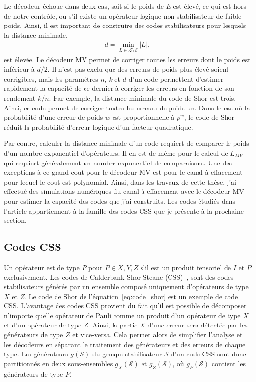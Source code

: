 Le décodeur échoue dans deux cas,
soit si le poids de $E$ est élevé, ce qui est hors de notre contrôle,
ou s'il existe un opérateur logique non stabilisateur de faible poids.
Ainsi,
il est important de construire des codes stabilisateurs pour lesquels la distance minimale,
\begin{align}
  d = \min_{L \in \mathcal L \setminus \mathcal S} |L|,
\end{align}
est élevée.
Le décodeur MV permet de corriger toutes les erreurs dont le poids est inférieur à $d / 2$.
Il n'est pas exclu que des erreurs de poids plus élevé soient corrigibles, 
mais les paramètres $n$, $k$ et $d$ d'un code permettent d'estimer rapidement la capacité
de ce dernier à corriger les erreurs en fonction de son rendement $k/n$.
Par exemple,
la distance minimale du code de Shor est trois.
Ainsi, ce code permet de corriger toutes les erreurs de poids un.
Dans le cas où la probabilité d'une erreur de poids $w$ est proportionnelle à $p^w$,
le code de Shor réduit la probabilité d'erreur logique d'un facteur quadratique.

Par contre,
calculer la distance minimale d'un code requiert de comparer le poids d'un nombre exponentiel d'opérateurs.
Il en est de même pour le calcul de $L_{MV}$ qui requiert généralement un nombre exponentiel de comparaisons.
Une des exceptions à ce grand cout pour le décodeur MV est pour le canal à effacement pour lequel
le cout est  polynomial.
Ainsi, dans les travaux de cette thèse,
j'ai effectué des simulations numériques du canal à effacement avec le décodeur MV pour estimer la
capacité des codes que j'ai construits.
Les codes étudiés dans l'article appartiennent 
à la famille des codes CSS que je présente à la prochaine section.

\subsection{Codes CSS}

Un opérateur est de type $P$ pour $P \in {X, Y, Z}$ s'il est un produit tensoriel de $I$ et $P$ exclusivement.
Les codes de Calderbank-Shor-Steane (CSS)~\cite{calderbank_good_1996, steane_multiple-particle_nodate},
sont des codes stabilisateurs générés par un ensemble composé uniquement d'opérateurs de type $X$ et $Z$.
Le code de Shor de l'équation~\ref{eq:code_shor} est un exemple de code CSS.
L'avantage des codes CSS provient du fait qu'il est possible de décomposer n'importe quelle opérateur
de Pauli comme un produit d'un opérateur de type $X$ et d'un opérateur de type $Z$.
Ainsi,
la partie $X$ d'une erreur sera détectée par les générateurs de type $Z$ et vice-versa.
Cela permet alors de simplifier l'analyse et les décodeurs en séparant le traitement des générateurs 
et des erreurs de chaque type.
Les générateurs $g(\mathcal S)$ du groupe stabilisateur $\mathcal S$ d'un
code CSS sont donc partitionnés en deux sous-ensembles $g_X(\mathcal S)$ et $g_Z(\mathcal S)$,
où $g_P(\mathcal S)$ contient les générateurs de type $P$.

